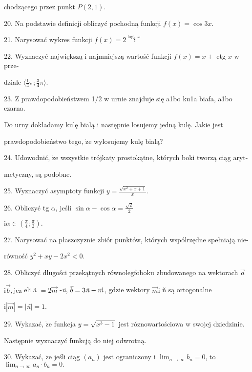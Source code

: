 \documentclass[a4paper,12pt]{article}
\begin{document}
chodzącego przez punkt $P(2,1).$

20. Na podstawie definicji obliczyć pochodną funkcji $f(x)=\cos 3x.$

21. Narysować wykres funkcji $f(x)=2^{\log_{\frac{1}{2}}x}$

22. Wyznaczyć największą i najmniejszą wartość funkcji $f(x)=x+$ ctg $x$ w prze-

dziale $\displaystyle \langle\frac{1}{4}\pi;\frac{3}{4}\pi\rangle.$

23. $\mathrm{Z}$ prawdopodobieństwem 1/2 w urnie znajduje się a1bo ku1a biafa, a1bo czarna.

Do urny dokladamy kulę bialą i następnie losujemy jedną kulę. Jakie jest

prawdopodobieństwo tego, $\dot{\mathrm{z}}\mathrm{e}$ wylosujemy kulę bialą?

24. Udowodnić, $\dot{\mathrm{z}}\mathrm{e}$ wszystkie trójkaty prostokątne, których boki tworzą ciąg aryt-

metyczny, są podobne.

25. Wyznaczyć asymptoty funkcji $y=\displaystyle \frac{\sqrt{x^{2}+x+1}}{x}.$

26. Obliczyć tg $\alpha$, jeśli $\displaystyle \sin\alpha-\cos\alpha=\frac{\sqrt{2}}{2}$

$\mathrm{i} \displaystyle \alpha\in(\frac{\pi}{4};\frac{\pi}{2}).$

27. Narysować na płaszczyz$\acute{}$nie zbiór punktów, których wspólrzędne spełniają nie-

równość $y^{2}+xy-2x^{2}<0.$

28. Obliczyć dlugości przekątnych równolegfoboku zbudowanego na wektorach $\vec{a}$

$\mathrm{i} \vec{b}, \mathrm{j}\mathrm{e}\dot{\mathrm{z}}$ eli ã $= 2\vec{m}$ -{\it ñ}, $\vec{b}= 3\text{{\it ñ}}-\vec{m}$, gdzie wektory $\vec{m} \mathrm{i}$ ñ są ortogonalne

$\mathrm{i}|\vec{m}|= |${\it ñ}$| =1.$

29. Wykazać, $\dot{\mathrm{z}}\mathrm{e}$ funkcja $y=\sqrt{x^{3}-1}$ jest róznowartościowa w swojej dziedzinie.

Następnie wyznaczyć funkcją do niej odwrotną.

30. Wykazać, $\dot{\mathrm{z}}\mathrm{e}$ jeśli ciąg $(a_{n})$ jest ograniczony i $\displaystyle \lim_{n\rightarrow\infty}b_{n}=0$, to $\displaystyle \lim_{n\rightarrow\infty}a_{n}\cdot b_{n}=0.$
\end{document}

